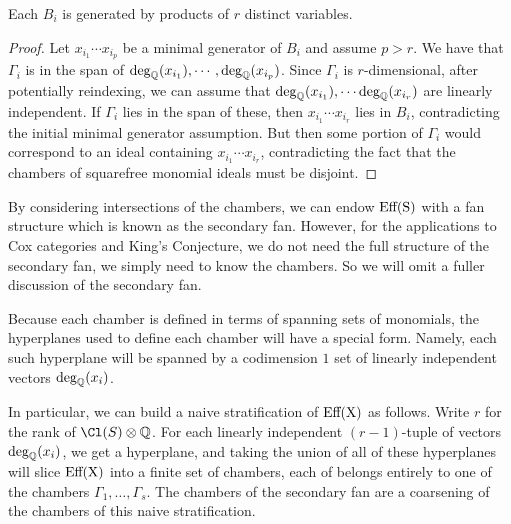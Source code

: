 \documentclass{amsart}
\begin{document}
\begin{cor}
  Each $B_i$ is generated by products of $r$ distinct variables.
\end{cor}
\begin{proof}
  Let $x_{i_1}\cdots x_{i_p}$ be a minimal generator of $B_i$ and assume $p>r$.  We have that $\Gamma_i$ is in the span of $\deg_{\mathbb Q}(x_{i_1}), \cdots, \deg_{\mathbb Q}(x_{i_p})$.   Since $\Gamma_i$ is $r$-dimensional, after potentially reindexing, we can assume that $\deg_{\mathbb Q}(x_{i_1}), \cdots \deg_{\mathbb Q}(x_{i_r})$ are linearly independent.  If $\Gamma_i$ lies in the span of these, then $x_{i_1}\cdots x_{i_r}$ lies in $B_i$, contradicting the initial minimal generator assumption.  But then some portion of $\Gamma_i$ would correspond to an ideal containing $x_{i_1}\cdots x_{i_r}$, contradicting the fact that the chambers of squarefree monomial ideals must be disjoint.
\end{proof}
\begin{remark}
  By considering intersections of the chambers, we can endow $\rm Eff(S)$ with a fan structure which is known as the secondary fan.  However, for the applications to Cox categories and King's Conjecture, we do not need the full structure of the secondary fan, we simply need to know the chambers.  So we will omit a fuller discussion of the secondary fan.
\end{remark}
\begin{remark}
  Because each chamber is defined in terms of spanning sets of monomials, the hyperplanes used to define each chamber will have a special form.  Namely, each such hyperplane will be spanned by a codimension $1$ set of linearly independent vectors $\deg_{\mathbb Q}(x_i)$.

  In particular, we can build a naive stratification of $\rm Eff(X)$ as follows.  Write $r$ for the rank of $\Cl(S)\otimes \QQ$.  For each linearly independent $(r-1)$-tuple of vectors $\deg_{\mathbb Q}(x_i)$, we get a hyperplane, and taking the union of all of these hyperplanes will slice $\rm Eff(X)$ into a finite set of chambers, each of belongs entirely to one of the chambers $\Gamma_1,\dots, \Gamma_s$.  The chambers of the secondary fan are a coarsening of the chambers of this naive stratification.
\end{remark}
\end{document}
